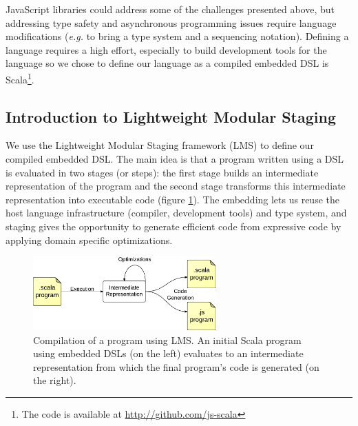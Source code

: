 \documentclass[american,english,runningheads]{llncs}
\newcommand{\eg}{\emph{e.g.}}
\begin{document}
JavaScript libraries could address some of the challenges presented above, but addressing type safety and
asynchronous programming issues require language modifications (\eg{} to bring a type system and a sequencing
notation). Defining a language requires a high effort, especially to build development tools for the language so we
chose to define our language as a compiled embedded DSL is Scala\footnote{The code is available at
\href{http://github.com/js-scala}{http://github.com/js-scala}}.

\subsection{Introduction to Lightweight Modular Staging}
\label{intro-lms}

We use the Lightweight Modular Staging framework (LMS) to define our compiled embedded DSL. The main idea is that a
program written using a DSL is evaluated in two stages (or steps): the first stage builds an intermediate
representation of the program and the second stage transforms this intermediate representation into executable code
(figure \ref{lms-diagram}). The embedding lets us reuse the host language infrastructure (compiler, development
tools) and type system, and staging gives the opportunity to generate efficient code from expressive code by applying
domain specific optimizations.

\begin{figure}
  \centering
  \includegraphics[width=7cm]{lms.pdf}
  \caption{Compilation of a program using LMS. An initial Scala program using embedded DSLs (on the left) evaluates
  to an intermediate representation from which the final program’s code is generated (on the right).}
  \label{lms-diagram}
\end{figure}
\end{document}
